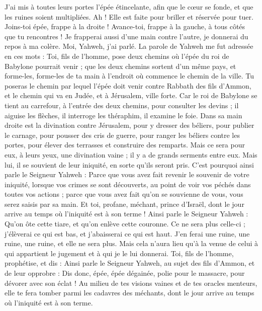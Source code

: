 \begin{multicols}{2}
J'ai mis à toutes leurs portes l'épée étincelante, afin que le cœur se fonde, et que les ruines soient multipliées. Ah ! Elle est faite pour briller et réservée pour tuer.
Joins-toi épée, frappe à la droite ! Avance-toi, frappe à la gauche, à tous côtés que tu rencontres !
Je frapperai aussi d'une main contre l'autre, je donnerai du repos à ma colère. Moi, Yahweh, j'ai parlé.
La parole de Yahweh me fut adressée en ces mots :
Toi, fils de l'homme, pose deux chemins où l'épée du roi de Babylone pourrait venir ; que les deux chemins sortent d'un même pays, et forme-les, forme-les de ta main à l'endroit où commence le chemin de la ville.
Tu poseras le chemin par lequel l'épée doit venir contre Rabbath des fils d'Ammon, et le chemin qui va en Judée, et à Jérusalem, ville forte.
Car le roi de Babylone se tient au carrefour, à l'entrée des deux chemins, pour consulter les devins ; il aiguise les flèches, il interroge les théraphim, il examine le foie.
Dans sa main droite est la divination contre Jérusalem, pour y dresser des béliers, pour publier le carnage, pour pousser des cris de guerre, pour ranger les béliers contre les portes, pour élever des terrasses et construire des remparts.
Mais ce sera pour eux, à leurs yeux, une divination vaine ; il y a de grands serments entre eux. Mais lui, il se souvient de leur iniquité, en sorte qu'ils seront pris.
C'est pourquoi ainsi parle le Seigneur Yahweh : Parce que vous avez fait revenir le souvenir de votre iniquité, lorsque vos crimes se sont découverts, au point de voir vos péchés dans toutes vos actions ; parce que vous avez fait qu'on se souvienne de vous, vous serez saisis par sa main.
Et toi, profane, méchant, prince d'Israël, dont le jour arrive au temps où l'iniquité est à son terme !
Ainsi parle le Seigneur Yahweh : Qu'on ôte cette tiare, et qu'on enlève cette couronne. Ce ne sera plus celle-ci ; j'élèverai ce qui est bas, et j'abaisserai ce qui est haut.
J'en ferai une ruine, une ruine, une ruine, et elle ne sera plus. Mais cela n'aura lieu qu'à la venue de celui à qui appartient le jugement et à qui je le lui donnerai.
Toi, fils de l'homme, prophétise, et dis : Ainsi parle le Seigneur Yahweh, au sujet des fils d'Ammon, et de leur opprobre : Dis donc, épée, épée dégainée, polie pour le massacre, pour dévorer avec son éclat !
Au milieu de tes visions vaines et de tes oracles menteurs, elle te fera tomber parmi les cadavres des méchants, dont le jour arrive au temps où l'iniquité est à son terme.

\end{multicols}
